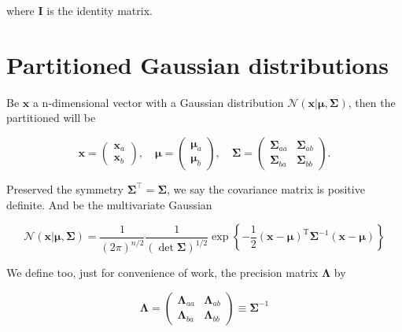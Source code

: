 \begin{appendices}
where $\mathbf{I}$ is the identity matrix.

\vspace{4em}

  \section{Partitioned Gaussian distributions\cite{schon_lindsten}}

  Be $\mathbf{x}$ a n-dimensional vector with a Gaussian distribution $\mathcal{N}\left( \mathbf{x} | \boldsymbol{\mu}, \boldsymbol{\Sigma} \right)$, then the partitioned will be
  
  \begin{equation}
    \mathbf{x}=
    \begin{pmatrix}
    \mathbf{x}_a \\  
    \mathbf{x}_b 
    \end{pmatrix}
    ,\quad 
    \boldsymbol{\mu}=
    \begin{pmatrix}
      \boldsymbol{\mu}_a \\
      \boldsymbol{\mu}_b
    \end{pmatrix}
    ,\quad 
    \boldsymbol{\Sigma}=
    \begin{pmatrix}
      \boldsymbol{\Sigma}_{aa} & \boldsymbol{\Sigma}_{ab}  \\
      \boldsymbol{\Sigma}_{ba} & \boldsymbol{\Sigma}_{bb}
    \end{pmatrix}
    .
  \end{equation}

  Preserved the symmetry $\boldsymbol{\Sigma}^\top = \boldsymbol{\Sigma}$, we say the covariance matrix is positive definite. And be the multivariate Gaussian

  \begin{equation}
    \label{eq:app-par-gau-multivariate-gaussian}
    \mathcal{N}(\mathbf{x} | \boldsymbol{\mu}, \mathbf{\Sigma})=\frac{1}{(2 \pi)^{n / 2}} \frac{1}{ \left( \det \mathbf{\Sigma} \right) ^{1 / 2}} \exp \left\{-\frac{1}{2}(\mathbf{x}-\boldsymbol{\mu})^{\mathrm{T}} \boldsymbol{\Sigma}^{-1}(\mathbf{x}-\boldsymbol{\mu})\right\}
  \end{equation}

  We define too, just for convenience of work, the precision matrix $\boldsymbol{\Lambda}$ by

  \begin{equation}
    \boldsymbol{\Lambda} = 
    \begin{pmatrix}
      \boldsymbol{\Lambda}_{aa} & \boldsymbol{\Lambda}_{ab}  \\
      \boldsymbol{\Lambda}_{ba} & \boldsymbol{\Lambda}_{bb}
    \end{pmatrix} 
    \equiv \boldsymbol{\Sigma}^{-1}
  \end{equation}


\end{appendices}
